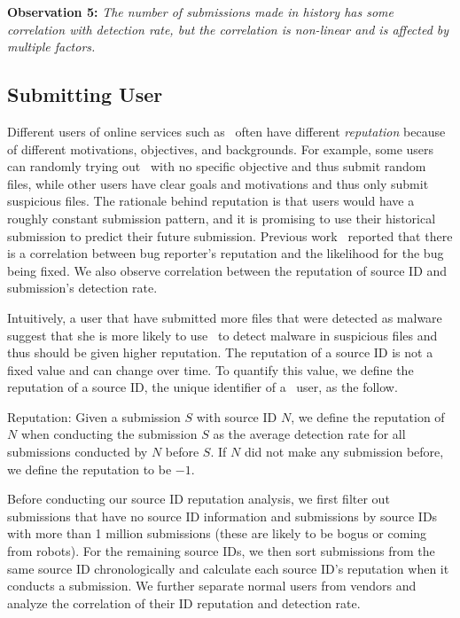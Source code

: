 {\bf Observation 5:} 
{\em The number of submissions made in history has some correlation with detection rate, 
but the correlation is non-linear and is affected by multiple factors.}

\subsection{Submitting User}
\label{sec:reputation}


Different users of online services such as \vt\ often have different {\em reputation} 
because of different motivations, objectives, and backgrounds.
For example, some users can randomly trying out \vt\ with no specific objective and thus submit random files,
while other users have clear goals and motivations and thus only submit suspicious files.
The rationale behind reputation is that \vt{} users would have a roughly constant submission pattern, 
and it is promising to use their historical submission to predict their future submission.
Previous work~\cite{GuoICSE2010} reported that there is a correlation between bug reporter's reputation and the likelihood for the bug being fixed. 
We also observe correlation between the reputation of source ID and submission's detection rate. 

Intuitively, a user that have submitted more files that were detected as malware suggest 
that she is more likely to use \vt\ to detect malware in suspicious files 
and thus should be given higher reputation.
The reputation of a source ID is not a fixed value and can change over time. 
To quantify this value, we define the reputation of a source ID, the unique identifier of a \vt\ user, as the follow.

\begin{definition}{Reputation:}
Given a submission $S$ with source ID $N$, 
we define the reputation of $N$ when conducting the submission $S$ as the average detection rate for all submissions conducted by $N$ before $S$. 
If $N$ did not make any submission before, we define the reputation to be $-1$. 
\end{definition}

Before conducting our source ID reputation analysis, we first filter out submissions
that have no source ID information and submissions by source IDs with more than 1 million submissions (these are likely to be bogus or coming from robots).
For the remaining source IDs, we then sort submissions from the same source ID chronologically 
and calculate each source ID's reputation when it conducts a submission. 
We further separate normal users from vendors and analyze the correlation of their ID reputation and detection rate.

